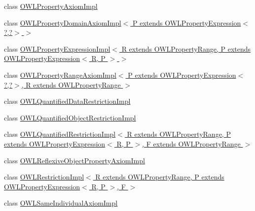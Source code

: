 \begin{DoxyCompactItemize}
\item 
class \hyperlink{classuk_1_1ac_1_1manchester_1_1cs_1_1owl_1_1owlapi_1_1_o_w_l_property_axiom_impl}{O\-W\-L\-Property\-Axiom\-Impl}
\item 
class \hyperlink{classuk_1_1ac_1_1manchester_1_1cs_1_1owl_1_1owlapi_1_1_o_w_l_property_domain_axiom_impl_3_01_p_0da3f17a1850e78bb831621c892c6c34a}{O\-W\-L\-Property\-Domain\-Axiom\-Impl$<$ P extends O\-W\-L\-Property\-Expression$<$?,?$>$ $>$}
\item 
class \hyperlink{classuk_1_1ac_1_1manchester_1_1cs_1_1owl_1_1owlapi_1_1_o_w_l_property_expression_impl_3_01_r_01e672e5abee4203a562fc61711ec3f6ded}{O\-W\-L\-Property\-Expression\-Impl$<$ R extends O\-W\-L\-Property\-Range, P extends O\-W\-L\-Property\-Expression$<$ R, P $>$ $>$}
\item 
class \hyperlink{classuk_1_1ac_1_1manchester_1_1cs_1_1owl_1_1owlapi_1_1_o_w_l_property_range_axiom_impl_3_01_p_0140de1eb4f83293eb8b942ec8e6d67c5c}{O\-W\-L\-Property\-Range\-Axiom\-Impl$<$ P extends O\-W\-L\-Property\-Expression$<$?,?$>$, R extends O\-W\-L\-Property\-Range $>$}
\item 
class \hyperlink{classuk_1_1ac_1_1manchester_1_1cs_1_1owl_1_1owlapi_1_1_o_w_l_quantified_data_restriction_impl}{O\-W\-L\-Quantified\-Data\-Restriction\-Impl}
\item 
class \hyperlink{classuk_1_1ac_1_1manchester_1_1cs_1_1owl_1_1owlapi_1_1_o_w_l_quantified_object_restriction_impl}{O\-W\-L\-Quantified\-Object\-Restriction\-Impl}
\item 
class \hyperlink{classuk_1_1ac_1_1manchester_1_1cs_1_1owl_1_1owlapi_1_1_o_w_l_quantified_restriction_impl_3_01_r_e04a97c08083d9e3c6f10e535b1571d1}{O\-W\-L\-Quantified\-Restriction\-Impl$<$ R extends O\-W\-L\-Property\-Range, P extends O\-W\-L\-Property\-Expression$<$ R, P $>$, F extends O\-W\-L\-Property\-Range $>$}
\item 
class \hyperlink{classuk_1_1ac_1_1manchester_1_1cs_1_1owl_1_1owlapi_1_1_o_w_l_reflexive_object_property_axiom_impl}{O\-W\-L\-Reflexive\-Object\-Property\-Axiom\-Impl}
\item 
class \hyperlink{classuk_1_1ac_1_1manchester_1_1cs_1_1owl_1_1owlapi_1_1_o_w_l_restriction_impl_3_01_r_01extends_07a3269898cc55de4409f398a643a25a6}{O\-W\-L\-Restriction\-Impl$<$ R extends O\-W\-L\-Property\-Range, P extends O\-W\-L\-Property\-Expression$<$ R, P $>$, F $>$}
\item 
class \hyperlink{classuk_1_1ac_1_1manchester_1_1cs_1_1owl_1_1owlapi_1_1_o_w_l_same_individual_axiom_impl}{O\-W\-L\-Same\-Individual\-Axiom\-Impl}

\end{DoxyCompactItemize}
